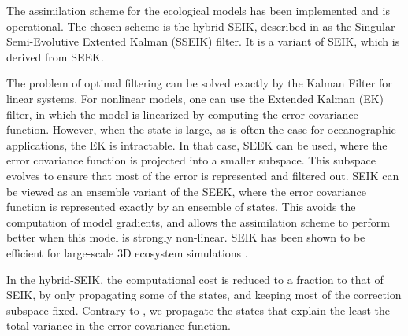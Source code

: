 The assimilation scheme for the ecological models has been implemented and is
operational. The chosen scheme is the hybrid-SEIK, described in
\citet{Hoteit2002} as the Singular Semi-Evolutive Extented Kalman (SSEIK)
filter. It is a variant of SEIK, which is derived from SEEK.

The problem of optimal filtering can be solved exactly by the Kalman Filter for
linear systems. For nonlinear models, one can use the Extended Kalman (EK)
filter, in which the model is linearized by computing the error covariance
function.  However, when the state is large, as is often the case for
oceanographic applications, the EK is intractable. In that case, SEEK can be
used, where the error covariance function is projected into a smaller subspace.
This subspace evolves to ensure that most of the error is represented and
filtered out. SEIK can be viewed as an ensemble variant of the SEEK, where the
error covariance function is represented exactly by an ensemble of states. This
avoids the computation of model gradients, and allows the assimilation scheme
to perform better when this model is strongly non-linear. SEIK has been shown
to be efficient for large-scale 3D ecosystem simulations
\citep{Triantfyllou2003}.

In the hybrid-SEIK, the computational cost is reduced to a fraction to that of
SEIK, by only propagating some of the states, and keeping most of the
correction subspace fixed. Contrary to \citet{Hoteit2002}, we propagate the
states that explain the least the total variance in the error covariance
function.
